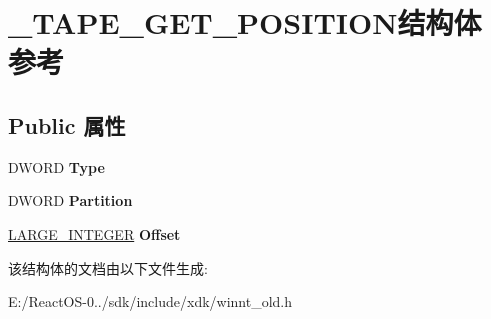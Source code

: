 \hypertarget{struct___t_a_p_e___g_e_t___p_o_s_i_t_i_o_n}{}\section{\+\_\+\+T\+A\+P\+E\+\_\+\+G\+E\+T\+\_\+\+P\+O\+S\+I\+T\+I\+O\+N结构体 参考}
\label{struct___t_a_p_e___g_e_t___p_o_s_i_t_i_o_n}
\subsection*{Public 属性}
\begin{DoxyCompactItemize}
\item 
\mbox{\label{struct___t_a_p_e___g_e_t___p_o_s_i_t_i_o_n_a2fddeb441b73726cac97ca091196e1f3}} 
D\+W\+O\+RD {\bfseries Type}
\item 
\mbox{\label{struct___t_a_p_e___g_e_t___p_o_s_i_t_i_o_n_aaa7ed6b465c34e13dd655744bf966556}} 
D\+W\+O\+RD {\bfseries Partition}
\item 
\mbox{\label{struct___t_a_p_e___g_e_t___p_o_s_i_t_i_o_n_a60173c1e8595fdae4c3d2f7a431b0ea4}} 
\hyperlink{union___l_a_r_g_e___i_n_t_e_g_e_r}{L\+A\+R\+G\+E\+\_\+\+I\+N\+T\+E\+G\+ER} {\bfseries Offset}
\end{DoxyCompactItemize}


该结构体的文档由以下文件生成\+:\begin{DoxyCompactItemize}
\item 
E\+:/\+React\+O\+S-\/0../sdk/include/xdk/winnt\+\_\+old.\+h\end{DoxyCompactItemize}
